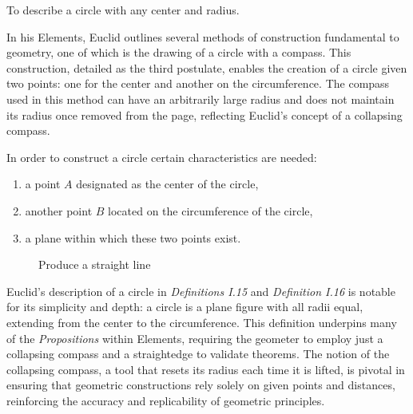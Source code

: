 \begin{post}
To describe a circle with any center and radius.
\end{post}

In his Elements, Euclid outlines several methods of construction fundamental to geometry, one of which is the drawing of a circle with a compass. This construction, detailed as the third postulate, enables the creation of a circle given two points: one for the center and another on the circumference. The compass used in this method can have an arbitrarily large radius and does not maintain its radius once removed from the page, reflecting Euclid's concept of a collapsing compass.

In order to construct a circle certain characteristics are needed: 

\begin{enumerate}

\item a point $A$ designated as the center of the circle, 
\item another point $B$ located on the circumference of the circle, 
\item a plane within which these two points exist. 

\end{enumerate}

\begin{figure}[H]
\centering
		\caption{Produce a straight line}
\end{figure}

Euclid's description of a circle in \textit{Definitions I.15} and \textit{Definition I.16} is notable for its simplicity and depth: a circle is a plane figure with all radii equal, extending from the center to the circumference. This definition underpins many of the \textit{Propositions} within Elements, requiring the geometer to employ just a collapsing compass and a straightedge to validate theorems. The notion of the collapsing compass, a tool that resets its radius each time it is lifted, is pivotal in ensuring that geometric constructions rely solely on given points and distances, reinforcing the accuracy and replicability of geometric principles.

